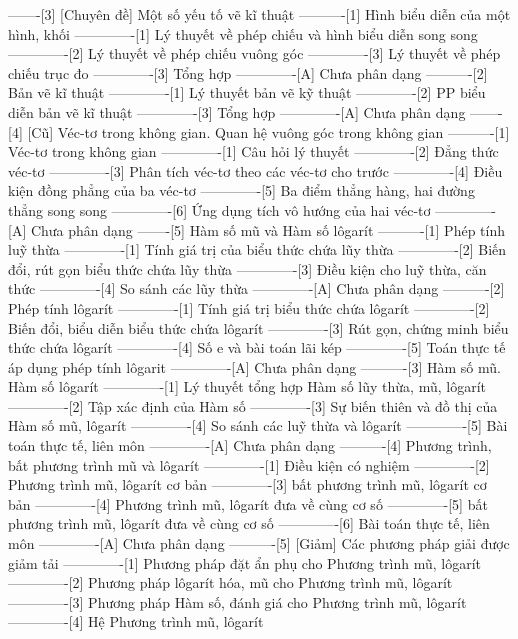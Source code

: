 -------[3] [Chuyên đề] Một số yếu tố vẽ kĩ thuật
----------[1] Hình biểu diễn của một hình, khối
-------------[1] Lý thuyết về phép chiếu và hình biểu diễn song song
-------------[2] Lý thuyết về phép chiếu vuông góc
-------------[3] Lý thuyết về phép chiếu trục đo
-------------[3] Tổng hợp
-------------[A] Chưa phân dạng
----------[2] Bản vẽ kĩ thuật
-------------[1] Lý thuyết bản vẽ kỹ thuật
-------------[2] PP biểu diễn bản vẽ kĩ thuật
-------------[3] Tổng hợp
-------------[A] Chưa phân dạng
-------[4] [Cũ] Véc-tơ trong không gian. Quan hệ vuông góc trong không gian
----------[1] Véc-tơ trong không gian
-------------[1] Câu hỏi lý thuyết
-------------[2] Đẳng thức véc-tơ
-------------[3] Phân tích véc-tơ theo các véc-tơ cho trước
-------------[4] Điều kiện đồng phẳng của ba véc-tơ
-------------[5] Ba điểm thẳng hàng, hai đường thẳng song song
-------------[6] Ứng dụng tích vô hướng của hai véc-tơ
-------------[A] Chưa phân dạng
-------[5] Hàm số mũ và Hàm số lôgarít
----------[1] Phép tính luỹ thừa
-------------[1] Tính giá trị của biểu thức chứa lũy thừa
-------------[2] Biến đổi, rút gọn biểu thức chứa lũy thừa
-------------[3] Điều kiện cho luỹ thừa, căn thức
-------------[4] So sánh các lũy thừa
-------------[A] Chưa phân dạng
----------[2] Phép tính lôgarít
-------------[1] Tính giá trị biểu thức chứa lôgarít
-------------[2] Biến đổi, biểu diễn biểu thức chứa lôgarít
-------------[3] Rút gọn, chứng minh biểu thức chứa lôgarít
-------------[4] Số e và bài toán lãi kép
-------------[5] Toán thực tế áp dụng phép tính lôgarit
-------------[A] Chưa phân dạng
----------[3] Hàm số mũ. Hàm số lôgarít
-------------[1] Lý thuyết tổng hợp Hàm số lũy thừa, mũ, lôgarít
-------------[2] Tập xác định của Hàm số
-------------[3] Sự biến thiên và đồ thị của Hàm số mũ, lôgarít
-------------[4] So sánh các luỹ thừa và lôgarít
-------------[5] Bài toán thực tế, liên môn
-------------[A] Chưa phân dạng
----------[4] Phương trình, bất phương trình mũ và lôgarít
-------------[1] Điều kiện có nghiệm
-------------[2] Phương trình mũ, lôgarít cơ bản
-------------[3] bất phương trình mũ, lôgarít cơ bản
-------------[4] Phương trình mũ, lôgarít đưa về cùng cơ số
-------------[5] bất phương trình mũ, lôgarít đưa về cùng cơ số
-------------[6] Bài toán thực tế, liên môn
-------------[A] Chưa phân dạng
----------[5] [Giảm] Các phương pháp giải được giảm tải
-------------[1] Phương pháp đặt ẩn phụ cho Phương trình mũ, lôgarít
-------------[2] Phương pháp lôgarít hóa, mũ cho Phương trình mũ, lôgarít
-------------[3] Phương pháp Hàm số, đánh giá cho Phương trình mũ, lôgarít
-------------[4] Hệ Phương trình mũ, lôgarít
